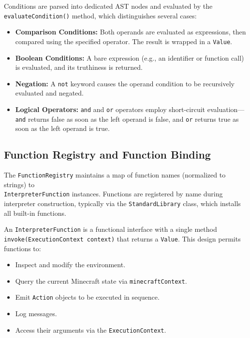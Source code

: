 Conditions are parsed into dedicated AST nodes and evaluated by the \texttt{evaluateCondition()} method, which distinguishes several cases:

\begin{itemize}
\item[\textbf{--}] \textbf{Comparison Conditions:} Both operands are evaluated as expressions, then compared using the specified operator. The result is wrapped in a \texttt{Value}.
\item[\textbf{--}] \textbf{Boolean Conditions:} A bare expression (e.g., an identifier or function call) is evaluated, and its truthiness is returned.
\item[\textbf{--}] \textbf{Negation:} A \texttt{not} keyword causes the operand condition to be recursively evaluated and negated.
\item[\textbf{--}] \textbf{Logical Operators:} \texttt{and} and \texttt{or} operators employ short-circuit evaluation---\texttt{and} returns false as soon as the left operand is false, and \texttt{or} returns true as soon as the left operand is true.
\end{itemize}

\subsection{Function Registry and Function Binding}

The \texttt{FunctionRegistry} maintains a map of function names (normalized to strings) to \\ \texttt{InterpreterFunction} instances.
Functions are registered by name during interpreter construction, typically via the \texttt{StandardLibrary} class, which installs all built-in functions.

An \texttt{InterpreterFunction} is a functional interface with a single method \\ \texttt{invoke(ExecutionContext context)} that returns a \texttt{Value}. This design permits functions to:
\begin{itemize}
\item[--] Inspect and modify the environment.
\item[--] Query the current Minecraft state via \texttt{minecraftContext}.
\item[--] Emit \texttt{Action} objects to be executed in sequence.
\item[--] Log messages.
\item[--] Access their arguments via the \texttt{ExecutionContext}.
\end{itemize}

